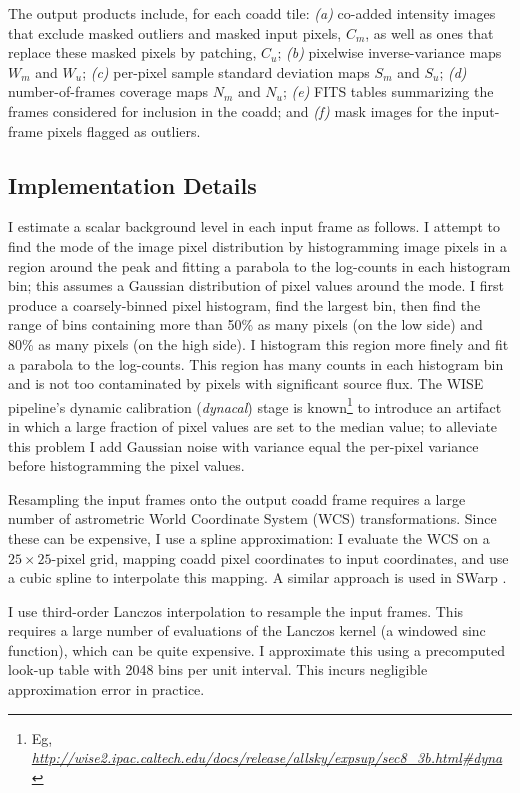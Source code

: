 \documentclass[11pt,preprint]{aastex}
\newcommand{\niceurl}[1]{\href{#1}{\textsl{#1}}}
\newcommand{\fimg}[1]{#1}
\newcommand{\coadd}{\fimg{C}}
\newcommand{\cowt}{\fimg{W}}
\newcommand{\con}{\fimg{N}}
\newcommand{\copp}{\fimg{S}}
\begin{document}
The output products include, for each coadd tile: \emph{(a)} co-added
intensity images that exclude masked outliers and masked input pixels,
$\coadd_m$, as well as ones that replace these masked pixels by patching,
$\coadd_u$; \emph{(b)} pixelwise inverse-variance maps $\cowt_m$ and
$\cowt_u$; \emph{(c)} per-pixel sample standard deviation maps
$\copp_m$ and $\copp_u$; \emph{(d)} number-of-frames coverage maps
$\con_m$ and $\con_u$; \emph{(e)} FITS tables summarizing the frames
considered for inclusion in the coadd; and \emph{(f)} mask images for
the input-frame pixels flagged as outliers.


\subsection{Implementation Details}
\label{sec:impl}


I estimate a scalar background level in each input frame as follows.
%
I attempt to find the mode of the image pixel distribution by
histogramming image pixels in a region around the peak and fitting a
parabola to the log-counts in each histogram bin; this assumes a
Gaussian distribution of pixel values around the mode.  I first
produce a coarsely-binned pixel histogram, find the largest bin, then
find the range of bins containing more than 50\% as many pixels (on
the low side) and 80\% as many pixels (on the high side).  I
histogram this region more finely and fit a parabola to the
log-counts.  This region has many counts in each histogram bin and is
not too contaminated by pixels with significant source flux.  The WISE
pipeline's dynamic calibration (\emph{dynacal}) stage is
known\footnote{Eg,
  \niceurl{http://wise2.ipac.caltech.edu/docs/release/allsky/expsup/sec8\_3b.html\#dyna}}
to introduce an artifact in which a large fraction of pixel values are
set to the median value; to alleviate this problem I add Gaussian
noise with variance equal the per-pixel variance before histogramming
the pixel values.


Resampling the input frames onto the output coadd frame requires a
large number of astrometric World Coordinate System (WCS)
transformations.  Since these can be expensive, I use a spline
approximation: I evaluate the WCS on a $25\times25$-pixel grid,
mapping coadd pixel coordinates to input coordinates, and use a cubic
spline to interpolate this mapping.  A similar approach is used in
SWarp \citep{swarp}.


I use third-order Lanczos interpolation to resample the input frames.
This requires a large number of evaluations of the Lanczos kernel (a
windowed sinc function), which can be quite expensive.  I approximate
this using a precomputed look-up table with 2048 bins per unit
interval.  This incurs negligible approximation error in practice.
\end{document}
